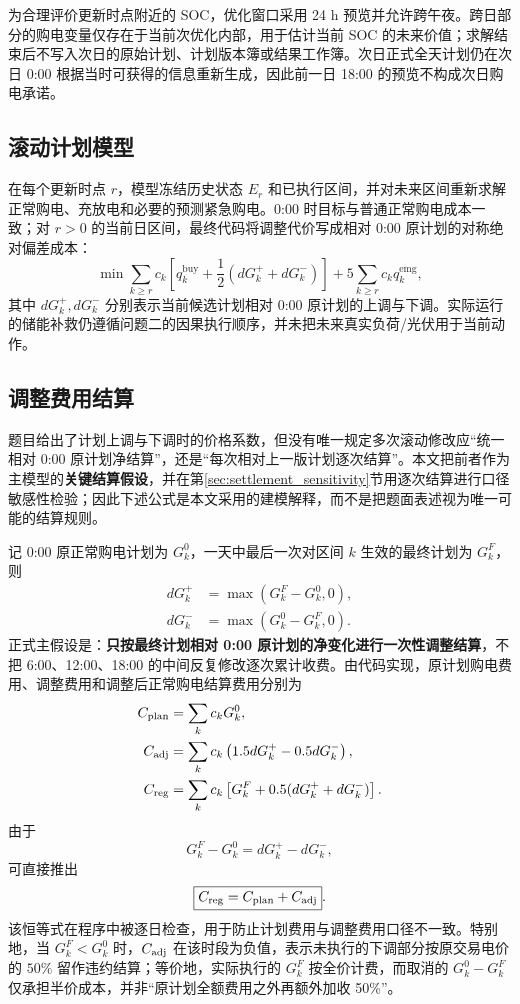 \documentclass[withoutpreface]{cumcmthesis}
\newcommand{\qbuy}{q^{\mathrm{buy}}}
\newcommand{\qemg}{q^{\mathrm{emg}}}
\begin{document}
为合理评价更新时点附近的 SOC，优化窗口采用 24 h 预览并允许跨午夜。跨日部分的购电变量仅存在于当前次优化内部，用于估计当前 SOC 的未来价值；求解结束后不写入次日的原始计划、计划版本簿或结果工作簿。次日正式全天计划仍在次日 0:00 根据当时可获得的信息重新生成，因此前一日 18:00 的预览不构成次日购电承诺。

\subsection{滚动计划模型}
在每个更新时点 $r$，模型冻结历史状态 $E_r$ 和已执行区间，并对未来区间重新求解正常购电、充放电和必要的预测紧急购电。0:00 时目标与普通正常购电成本一致；对 $r>0$ 的当前日区间，最终代码将调整代价写成相对 0:00 原计划的对称绝对偏差成本：
\begin{equation}
\min \sum_{k\ge r} c_k\left[\qbuy_k+\frac12\left(dG_k^++dG_k^-\right)\right]
+5\sum_{k\ge r}c_k\qemg_k,
\label{eq:q3planobj}
\end{equation}
其中 $dG_k^+,dG_k^-$ 分别表示当前候选计划相对 0:00 原计划的上调与下调。实际运行的储能补救仍遵循问题二的因果执行顺序，并未把未来真实负荷/光伏用于当前动作。

\subsection{调整费用结算}
题目给出了计划上调与下调时的价格系数，但没有唯一规定多次滚动修改应“统一相对 0:00 原计划净结算”，还是“每次相对上一版计划逐次结算”。本文把前者作为主模型的\textbf{关键结算假设}，并在第\ref{sec:settlement_sensitivity}节用逐次结算进行口径敏感性检验；因此下述公式是本文采用的建模解释，而不是把题面表述视为唯一可能的结算规则。

记 0:00 原正常购电计划为 $G_k^0$，一天中最后一次对区间 $k$ 生效的最终计划为 $G_k^F$，则
\begin{align}
dG_k^+&=\max(G_k^F-G_k^0,0),\\
dG_k^-&=\max(G_k^0-G_k^F,0).
\end{align}
正式主假设是：\textbf{只按最终计划相对 0:00 原计划的净变化进行一次性调整结算}，不把 6:00、12:00、18:00 的中间反复修改逐次累计收费。由代码实现，原计划购电费用、调整费用和调整后正常购电结算费用分别为
\begin{align}
C_{\rm plan}&=\sum_k c_kG_k^0,\label{eq:cplan}\\
C_{\rm adj}&=\sum_kc_k\left(1.5dG_k^+-0.5dG_k^-\right),\label{eq:cadj}\\
C_{\rm reg}&=\sum_kc_k\left[G_k^F+0.5(dG_k^++dG_k^-)\right].\label{eq:creg}
\end{align}
由于
\[
G_k^F-G_k^0=dG_k^+-dG_k^-,
\]
可直接推出
\begin{equation}
\boxed{C_{\rm reg}=C_{\rm plan}+C_{\rm adj}}.
\label{eq:costidentity}
\end{equation}
该恒等式在程序中被逐日检查，用于防止计划费用与调整费用口径不一致。特别地，当 $G_k^F<G_k^0$ 时，$C_{\rm adj}$ 在该时段为负值，表示未执行的下调部分按原交易电价的 $50\%$ 留作违约结算；等价地，实际执行的 $G_k^F$ 按全价计费，而取消的 $G_k^0-G_k^F$ 仅承担半价成本，并非“原计划全额费用之外再额外加收 50\%”。
\end{document}
